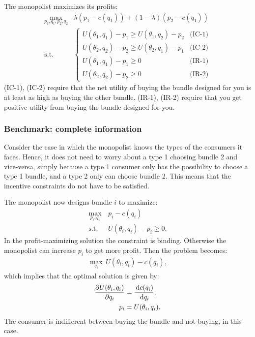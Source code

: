 The monopolist maximizes its profits:
\begin{align}
	\underset{p_1,q_1,p_2,q_2}{\max} & \lambda(p_1-c(q_1))+(1-\lambda)(p_2-c(q_1)) \\
	\text{s.t.}                      & \begin{cases}
		                                   U(\theta_1,q_1)-p_1\geq
		                                   U(\theta_1,q_2)-p_2      & \text{(IC-1)} \\
		                                   U(\theta_2,q_2)-p_2\geq
		                                   U(\theta_2,q_1)-p_1      & \text{(IC-2)} \\
		                                   U(\theta_1,q_1)-p_1\geq0 & \text{(IR-1)} \\
		                                   U(\theta_2,q_2)-p_2\geq0 & \text{(IR-2)}
	                                   \end{cases}
\end{align}
(IC-1), (IC-2) require that the net utility of buying the bundle designed for
you is at least as high as buying the other bundle. (IR-1), (IR-2) require that
you get positive utility from buying the bundle designed for you.
\subsubsection{Benchmark: complete information}
Consider the case in which the monopolist knows the types of the consumers
it faces. Hence, it does not need to worry about a type 1 choosing bundle 2
and vice-versa, simply because a type 1 consumer only has the possibility to
choose a type 1 bundle, and a type 2 only can choose bundle 2. This means that
the incentive constraints do not have to be satisfied.

The monopolist now designs bundle $i$ to maximize:
\begin{align}
	\underset{p_i,q_i}{\max}\, & p_i-c(q_i)                \\
	\text{s.t. }               & U(\theta_i,q_i)-p_i\geq0.
\end{align}
In the profit-maximizing solution the constraint is binding. Otherwise the
monopolist can increase $p_i$ to get more profit. Then the problem becomes:
\begin{align}
	\underset{q_i}{\max}\,U(\theta_i,q_i)-c(q_i),
	\label{eq:ch4max}
\end{align}
which implies that the optimal solution is given by:
\begin{align}
	\frac{\partial U(\theta_i,q_i)}{\partial q_i} & = \frac{\,\textrm{d}c(q_i)}{\,\textrm{d}q_i}, \\
	p_i                         & = U(\theta_i,q_i).
\end{align}
The consumer is indifferent between buying the bundle and not buying, in this
case.

